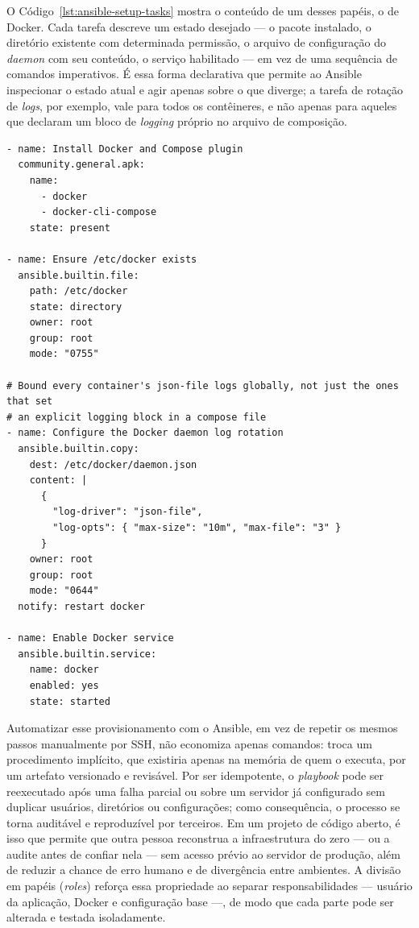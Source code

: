 
O Código~\ref{lst:ansible-setup-tasks} mostra o conteúdo de um desses papéis, o
de Docker. Cada tarefa descreve um estado desejado --- o pacote instalado, o
diretório existente com determinada permissão, o arquivo de configuração do
\textit{daemon} com seu conteúdo, o serviço habilitado --- em vez de uma
sequência de comandos imperativos. É essa forma declarativa que permite ao
Ansible inspecionar o estado atual e agir apenas sobre o que diverge; a tarefa
de rotação de \textit{logs}, por exemplo, vale para todos os contêineres, e não
apenas para aqueles que declaram um bloco de \textit{logging} próprio no arquivo
de composição.

\begin{lstlisting}[caption={Tarefas de provisionamento utilizando um \textit{playbook}}, label={lst:ansible-setup-tasks}]
- name: Install Docker and Compose plugin
  community.general.apk:
    name:
      - docker
      - docker-cli-compose
    state: present

- name: Ensure /etc/docker exists
  ansible.builtin.file:
    path: /etc/docker
    state: directory
    owner: root
    group: root
    mode: "0755"

# Bound every container's json-file logs globally, not just the ones that set
# an explicit logging block in a compose file
- name: Configure the Docker daemon log rotation
  ansible.builtin.copy:
    dest: /etc/docker/daemon.json
    content: |
      {
        "log-driver": "json-file",
        "log-opts": { "max-size": "10m", "max-file": "3" }
      }
    owner: root
    group: root
    mode: "0644"
  notify: restart docker

- name: Enable Docker service
  ansible.builtin.service:
    name: docker
    enabled: yes
    state: started

\end{lstlisting}


Automatizar esse provisionamento com o Ansible, em vez de repetir os mesmos
passos manualmente por SSH, não economiza apenas comandos: troca um
procedimento implícito, que existiria apenas na memória de quem o executa, por
um artefato versionado e revisável. Por ser idempotente, o \textit{playbook}
pode ser reexecutado após uma falha parcial ou sobre um servidor já configurado
sem duplicar usuários, diretórios ou configurações; como consequência, o
processo se torna auditável e reproduzível por terceiros.
Em um projeto de código aberto, é isso que permite que outra pessoa reconstrua
a infraestrutura do zero --- ou a audite antes de confiar nela --- sem acesso
prévio ao servidor de produção, além de reduzir a chance de erro humano e de
divergência entre ambientes. A divisão em papéis (\textit{roles}) reforça essa
propriedade ao separar responsabilidades --- usuário da aplicação, Docker e
configuração base ---, de modo que cada parte pode ser alterada e testada
isoladamente.


